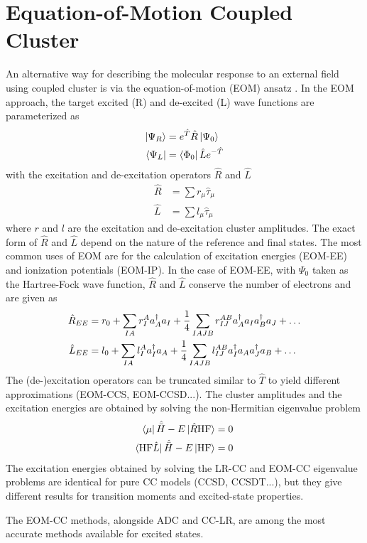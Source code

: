 
\section{Equation-of-Motion Coupled Cluster}

An alternative way for describing the molecular response to an external field using coupled cluster is via the equation-of-motion (EOM) ansatz \cite{Gee1989,EMr1981,Sta1993,Sta1994,Kry2008}. In the EOM approach, the target excited (R) and de-excited (L) wave functions are parameterized as 
\begin{align}
\ket{\smash{\Psi_R}} &= e^{\hat{T}} \hat{R} \ket{\smash{\Psi_0}} \\
\bra{\smash{\Psi_L}} &= \bra{\smash{\Phi_0}} \hat{L} e^{-\hat{T}} 
\end{align}
\noindent with the excitation and de-excitation operators $\hat{R}$ and $\hat{L}$ 
\begin{align}
\hat{R} &= \sum r_{\mu} \hat{\tau}_{\mu} \\
\hat{L} &= \sum l_{\mu} \hat{\tau}_{\mu}
\end{align}
\noindent where $r$ and $l$ are the excitation and de-excitation cluster amplitudes. The exact form of $\hat{R}$ and $\hat{L}$ depend on the nature of the reference and final states. The most common uses of EOM are for the calculation of excitation energies (EOM-EE) and ionization potentials (EOM-IP). In the case of EOM-EE, with $\Psi_0$ taken as the Hartree-Fock wave function, $\hat{R}$ and $\hat{L}$ conserve the number of electrons and are given as
\begin{align}
\hat{R}_{EE} &= r_0 + \sum_{IA} r_I^A a_A^{\dagger} a_I + \frac{1}{4} \sum_{IAJB} r_{IJ}^{AB} a_A^{\dagger} a_I a_B^{\dagger} a_J + \ldots \\
\hat{L}_{EE} &= l_0 + \sum_{IA} l_I^A a_I^{\dagger} a_A + \frac{1}{4} \sum_{IAJB} l_{IJ}^{AB} a_I^{\dagger} a_A a_J^{\dagger} a_B + \ldots
\end{align}
The (de-)excitation operators can be truncated similar to $\hat{T}$ to yield different approximations (EOM-CCS, EOM-CCSD...). The cluster amplitudes and the excitation energies are obtained 
by solving the non-Hermitian eigenvalue problem 
\begin{align}
\bra{\smash{\mu}} \hat{\bar{H}} - E  \ket{\smash{\hat{R} \text{HF}}} &= 0 \\
\bra{\smash{\text{HF} \hat{L}}} \hat{\bar{H}} - E \ket{\smash{\text{HF}}} &= 0
\end{align}
The excitation energies obtained by solving the LR-CC and EOM-CC eigenvalue problems are identical for pure CC models (CCSD, CCSDT...), but they give different results for transition moments and excited-state properties.

The EOM-CC methods, alongside ADC and CC-LR, are among the most accurate methods available for excited states. 